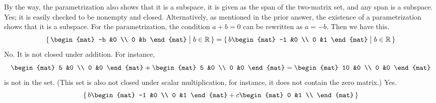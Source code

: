 \begin{exercises}
\begin{answer}
\begin{exparts}
          By the way, the parametrization also shows that it is a subspace,
          it is given as the span of the two-matrix set,
          and any span is a subspace.
        \partsitem Yes; it is easily checked to be nonempty and closed.
         Alternatively, as mentioned in the prior answer, the existence
         of a parametrization shows that it is a subspace.
         For the parametrization, 
         the condition $a+b=0$ can be rewritten as $a=-b$.
         Then we have this.
          \begin{equation*}
            \set{\begin{mat}
                    -b  &0  \\
                    0   &b
                  \end{mat}
                 \suchthat b\in\Re}
            =\set{b\begin{mat}
                    -1  &0  \\
                    0   &1
                  \end{mat}
                 \suchthat b\in\Re}
          \end{equation*}
        \partsitem No.
          It is not closed under addition.
          For instance, 
          \begin{equation*}
            \begin{mat}
              5  &0  \\
              0  &0
            \end{mat}
            +\begin{mat}
              5  &0  \\
              0  &0
            \end{mat}
            =\begin{mat}
              10  &0  \\
              0  &0
            \end{mat}
          \end{equation*}
          is not in the set.
          (This set is also not closed under scalar multiplication,
          for instance, it does not contain the zero matrix.)
        \partsitem Yes.
          \begin{equation*}
            \set{b\begin{mat}
                    -1  &0  \\
                    0   &1
                  \end{mat}
                 +c\begin{mat}
                    0  &1  \\

\end{mat}}
\end{equation*}
\end{exparts}
\end{answer}
\end{exercises}
